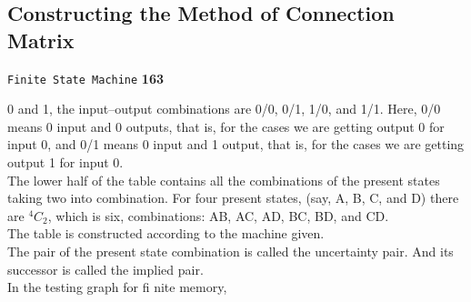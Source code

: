 \documentclass[9pt]{beamer}
\begin{document}
\begin{frame}
\section*{Constructing the Method of Connection Matrix}
\begin{flushright}
 \texttt{Finite State Machine} \hspace*{1cm} \textbf{163}
\end{flushright}

\vspace*{0.5cm}
0 and 1, the input–output combinations are 0/0, 0/1, 1/0, and 1/1. Here, 0/0 means 0 input and 0 outputs,
that is, for the cases we are getting output 0 for input 0, and 0/1 means 0 input and 1 output, that is, for
the cases we are getting output 1 for input 0.\\
\hspace*{0.5cm} The lower half of the table contains all the combinations of the present states taking two into combination.
For four present states, (say, A, B, C, and D) there are $^{4} C _{2}$, which is six, combinations: AB, AC,
AD, BC, BD, and CD.\\
\hspace{0.5cm} The table is constructed according to the machine given.\\
\hspace{0.5cm} The pair of the present state combination is called the uncertainty pair. And its successor is called
the implied pair.\\

In the testing graph for fi nite memory,\\

\end{frame}
\end{document}
